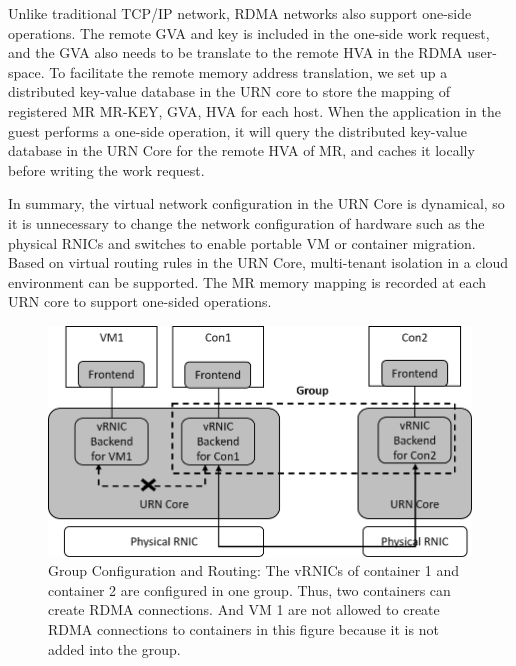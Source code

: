 Unlike traditional TCP/IP network, RDMA networks also support one-side operations. The remote GVA and key is included in the one-side work request, and the GVA also needs to be translate to the remote HVA in the RDMA user-space. To facilitate the remote memory address translation, we set up a distributed key-value database in the URN core to store the mapping of registered MR {MR-KEY, GVA, HVA} for each host. When the application in the guest performs a one-side operation, it will query the distributed key-value database in the URN Core for the remote HVA of MR, and caches it locally before writing the work request.

In summary, the virtual network configuration in the URN Core is dynamical, so it is unnecessary to change the network configuration of hardware such as the physical RNICs and switches to enable portable VM or container migration. Based on virtual routing rules in the URN Core, multi-tenant isolation in a cloud environment can be supported. The MR memory mapping is recorded at each URN core to support one-sided operations.

\begin{figure}[!ht]
	\centering
	\includegraphics[width=1.0\linewidth]{images/route-config}
	\caption{Group Configuration and Routing: The vRNICs of container 1 and container 2 are configured in one group. Thus, two containers can create RDMA connections. And VM 1 are not allowed to create RDMA connections to containers in this figure because it is not added into the group. }
	\label{fig:route-config}
\end{figure}

